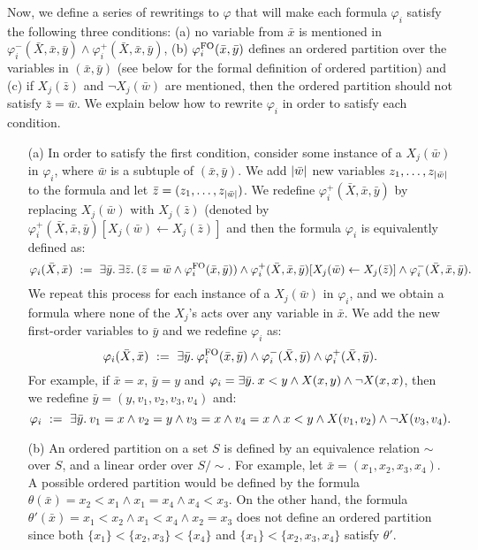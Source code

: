 Now, we define a series of rewritings to $\varphi$ that will make each formula $\varphi_i$ satisfy the following three conditions: (a) no variable from $\bar{x}$ is mentioned in $\varphi_i^{-}(\bar{X},\bar{x},\bar{y})\wedge\varphi_i^{+}(\bar{X},\bar{x},\bar{y})$, (b) $\varphi_i^{{\rm FO}}(\bar{x},\bar{y})$ defines an ordered partition over the variables in $(\bar{x},\bar{y})$ (see below for the formal definition of ordered partition) and (c) if $X_j(\bar{z})$ and $\neg X_j(\bar{w})$ are mentioned, then the ordered partition should not satisfy $\bar{z} = \bar{w}$.
We explain below how to rewrite $\varphi_i$ in order to satisfy each condition.
\begin{itemize} \itemsep1mm
	\item[(a)] In order to satisfy the first condition, consider some instance of a $X_j(\bar{w})$ in $\varphi_i$, where $\bar{w}$ is a subtuple of $(\bar{x},\bar{y})$. We add $\vert \bar{w} \vert$ new variables $z_1,\ldots,z_{\vert \bar{w} \vert}$ to the formula and let $\bar{z} = (z_1,\ldots,z_{\vert \bar{w} \vert})$. We redefine $\varphi_i^{+}(\bar{X},\bar{x},\bar{y})$ by replacing $X_j(\bar{w})$ with $X_j(\bar{z})$ (denoted by $\varphi_i^{+}(\bar{X},\bar{x},\bar{y})[X_j(\bar{w}) \leftarrow X_j(\bar{z})]$ and then the formula $\varphi_i$ is equivalently defined as:
	$$
	\varphi_i(\bar{X},\bar{x}) \ := \ \exists{\bar{y}}.\: \exists{\bar{z}}.\: (\bar{z} = \bar{w} \wedge \varphi_i^{{\rm FO}}(\bar{x},\bar{y})) \wedge \varphi_i^{+}(\bar{X},\bar{x},\bar{y})[X_j(\bar{w}) \leftarrow X_j(\bar{z})] \wedge
	\varphi_i^{-}(\bar{X},\bar{x},\bar{y}).
	$$
	We repeat this process for each instance of a $X_j(\bar{w})$ in $\varphi_i$, and we obtain a formula where none of the $X_j$'s acts over any variable in $\bar{x}$. We add the new first-order variables to $\bar{y}$ and we redefine $\varphi_i$ as:
	$$
	\varphi_i(\bar{X},\bar{x}) \ := \  \exists{\bar{y}}.\: \varphi_i^{{\rm FO}}(\bar{x},\bar{y}) \wedge \varphi_i^{-}(\bar{X},\bar{y}) \wedge \varphi_i^{+}(\bar{X},\bar{y}).
	$$
	For example, if $\bar{x} = x$, $\bar{y} = y$ and $\varphi_i = \exists{\bar{y}}.\:  x < y \wedge  X(x,y)\wedge \neg X(x,x)$, then we redefine $\bar{y} = (y,v_1,v_2,v_3,v_4)$ and:
	$$
	\varphi_i \ := \ \exists{\bar{y}}.\: v_1 = x \wedge v_2 = y \wedge v_3 = x \wedge v_4 = x \wedge x < y  \wedge  X(v_1,v_2) \wedge \neg X(v_3,v_4).
	$$ 
	\item[(b)] An ordered partition on a set $S$ is defined by an equivalence relation $\sim$ over $S$, and a linear order over $S/\!\sim$. For example, let $\bar{x} = (x_1,x_2,x_3,x_4)$. A possible ordered partition would be defined by the formula $\theta(\bar{x}) = x_2 < x_1 \wedge x_1 = x_4 \wedge x_4 < x_3$. On the other hand, the formula $\theta'(\bar{x}) = x_1 < x_2 \wedge x_1 < x_4 \wedge x_2 = x_3$ does not define an ordered partition since both $\{x_1\}<\{x_2,x_3\}<\{x_4\}$ and $\{x_1\} < \{x_2,x_3,x_4\}$ satisfy $\theta'$.

\end{itemize}
